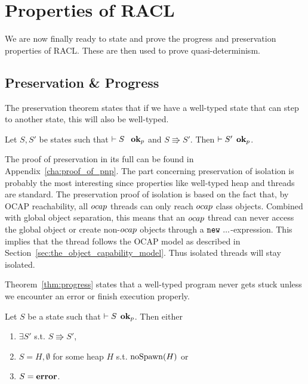\chapter{Properties of RACL}
\label{cha:properties_of_racl}


We are now finally ready to state and prove the progress and preservation
properties of RACL. These are then used to prove
quasi-determinism. 


\section{Preservation \& Progress}%
\label{sec:preservation_and_progress}

The preservation theorem states that if we have a well-typed state that can
step to another state, this will also be well-typed.

\begin{theorem}[Preservation]
  \label{thm:preservation}
  Let $S, S'$ be states such that $\vdash S \:\:~\mbox{{\bf ok}$_p$}$ and $S \Rrightarrow
  S'$. Then $\vdash S' \:\: \mbox{{\bf ok}$_p$}$.
\end{theorem}

The proof of preservation in its full can be found in
Appendix~\ref{cha:proof_of_pnp}. The part concerning preservation of isolation
is probably the most interesting since properties like well-typed heap and
threads are standard. The preservation proof of isolation is based on the
fact that, by OCAP reachability, all $\mbox{$ocap$}$ threads can only reach $\mbox{$ocap$}$
class objects. Combined with global object separation, this means that an
$\mbox{$ocap$}$ thread can never access the global object or create non-$\mbox{$ocap$}$ objects
through a $\mbox{\mdseries\texttt{new}~$...$}$-expression. This implies that the thread follows the OCAP model
as described in Section~\ref{sec:the_object_capability_model}. Thus isolated
threads will stay isolated.

Theorem~\ref{thm:progress} states that a well-typed program never gets stuck
unless we encounter an error or finish execution properly.
\begin{theorem}[Progress]
  \label{thm:progress}
  Let $S$ be a state such that $\vdash S \:\: \mbox{{\bf ok}$_p$}$. Then either 
  \begin{enumerate}
    \item $\exists S'$ s.t. $S \Rrightarrow S'$, 
    \item $S = H, \emptyset$ for some heap $H$ s.t. $\mbox{$\mathrm{noSpawn}$}{(H)}$ or
    \item $S = \mbox{{\bf error}}$.
  \end{enumerate}
\end{theorem}

